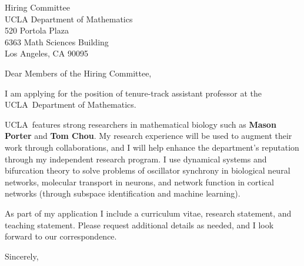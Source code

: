 \documentclass[11pt,a4paper]{letter}
\begin{document}
\def\School{UCLA}
\begin{letter}
{Hiring Committee\\
UCLA Department of Mathematics\\
520 Portola Plaza\\
6363 Math Sciences Building\\
Los Angeles, CA 90095}


\opening{Dear Members of the Hiring Committee,}

I am applying for the position of tenure-track assistant professor at the \School~Department of Mathematics. 



\School~features strong researchers in mathematical biology such as \textbf{Mason Porter} and \textbf{Tom Chou}. My research experience will be used to augment their work through collaborations, and I will help enhance the department's reputation through my independent research program. I use dynamical systems and bifurcation theory to solve problems of oscillator synchrony in biological neural networks, molecular transport in neurons, and network function in cortical networks (through subspace identification and machine learning).



As part of my application I include a curriculum vitae, research statement, and teaching statement. Please request additional details as needed, and I look forward to our correspondence.

\closing{Sincerely,}
\end{letter}
\end{document}

